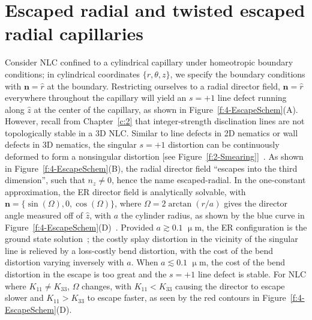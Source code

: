 \section{Escaped radial and twisted escaped radial capillaries}
Consider NLC confined to a cylindrical capillary under homeotropic boundary conditions; in cylindrical coordinates $\{r,\theta,z\}$, we specify the boundary conditions with $\mathbf{n} = \hat{r}$ at the boundary.
Restricting ourselves to a radial director field, $\mathbf{n} = \hat{r}$ everywhere throughout the capillary will yield an $s = +1$ line defect running along $\hat{z}$ at the center of the capillary, as shown in Figure~\ref{f:4-EscapeSchem}(A).
However, recall from Chapter~\ref{c:2} that integer-strength disclination lines are not topologically stable in a 3D NLC.
Similar to line defects in 2D nematics or wall defects in 3D nematics, the singular $s = +1$ distortion can be continuously deformed to form a nonsingular distortion [see Figure~\ref{f:2-Smearing}]~\cite{RN179,RN290,RN289}.
As shown in Figure~\ref{f:4-EscapeSchem}(B), the radial director field ``escapes into the third dimension'', such that  $n_{z} \neq 0$, hence the name escaped-radial.
In the one-constant approximation, the ER director field is analytically solvable, with $\mathbf{n} = \{\sin(\Omega),0,\cos(\Omega)\}$, where $\Omega = 2 \arctan(r/a)$ gives the director angle measured off of $\hat{z}$, with $a$ the cylinder radius, as shown by the blue curve in Figure~\ref{f:4-EscapeSchem}(D)~\cite{RN179,RN290}.
Provided $a \gtrsim 0.1$ $\upmu$m, the ER configuration is the ground state solution~\cite{RN194}; the costly splay distortion in the vicinity of the singular line is relieved by a loss-costly bend distortion, with the cost of the bend distortion varying inversely with $a$.
When $a \lesssim 0.1$ $\upmu$m, the cost of the bend distortion in the escape is too great and the $s = +1$ line defect is stable.
For NLC where $K_{11} \neq K_{33}$, $\Omega$ changes, with $K_{11} < K_{33}$ causing the director to escape slower and  $K_{11} > K_{33}$ to escape faster, as seen by the red contours in Figure~\ref{f:4-EscapeSchem}(D).
